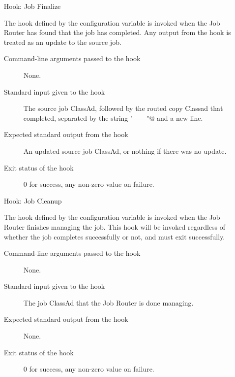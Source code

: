 \begin{itemize}
\item[Hook: Job Finalize]

  The hook defined by the configuration variable 
  is invoked when the Job Router has found that the job has completed.
  Any output from the hook is treated as an update to the source job.

\begin{description}
\item[Command-line arguments passed to the hook]
  None.
\item[Standard input given to the hook]
  The source job ClassAd, followed by the routed copy Classad that completed,
  separated by the string \verb@"------"@ and a new line.
\item[Expected standard output from the hook]
  An updated source job ClassAd, or nothing if there was no update.
\item[Exit status of the hook]
  0 for success, any non-zero value on failure.
\end{description}

\item[Hook: Job Cleanup]

  The hook defined by the configuration variable 
  is invoked when the Job Router finishes managing the job.
  This hook will be invoked regardless of whether the job
  completes successfully or not,
  and must exit successfully.

\begin{description}
\item[Command-line arguments passed to the hook]
  None.
\item[Standard input given to the hook]
  The job ClassAd that the Job Router is done managing.
\item[Expected standard output from the hook]
  None.
\item[Exit status of the hook]
  0 for success, any non-zero value on failure.
\end{description}

\end{itemize}

